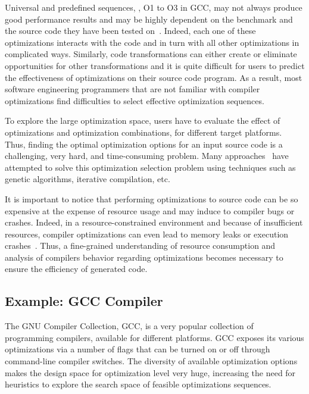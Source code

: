 Universal and predefined sequences, \eg, O1 to O3 in GCC, may not always produce good performance results and may be highly dependent on the benchmark and the source code they have been tested on~\cite{almagor2004finding,hoste2008cole}.
Indeed, each one of these optimizations interacts with the code and in turn with all other optimizations in complicated ways. Similarly, code transformations can either create or eliminate opportunities for other transformations and it is quite difficult for users to predict the effectiveness of optimizations on their source code program.
As a result, most software engineering programmers that are not familiar with compiler optimizations find difficulties to select effective optimization sequences.

To explore the large optimization space, users have to evaluate the effect of optimizations and optimization combinations, for different target platforms. 
Thus, finding the optimal optimization options for an input source code is a challenging, very hard, and time-consuming problem. 
Many approaches~\cite{hoste2008cole,zhong2009tuning,sandran2012genetic,martins2014exploration} have attempted to solve this optimization selection problem using techniques such as genetic algorithms, iterative compilation, etc.

It is important to notice that performing optimizations to source code can be so expensive at the expense of resource usage and may induce to compiler bugs or crashes. 
Indeed, in a resource-constrained environment and because of insufficient resources, compiler optimizations can even lead to memory leaks or execution crashes~\cite{yang2011finding}. 
Thus, a fine-grained understanding of resource consumption and analysis of compilers behavior regarding optimizations becomes necessary to ensure the efficiency of generated code.

\subsection{Example: GCC Compiler}

The GNU Compiler Collection, GCC, is a very popular collection of programming compilers, available for different platforms.
GCC exposes its various optimizations via a number of flags that can be turned on or off through command-line compiler switches. 
The diversity of available optimization options makes the design space for optimization level very huge, increasing the need for heuristics to explore the search space of feasible optimizations sequences.

